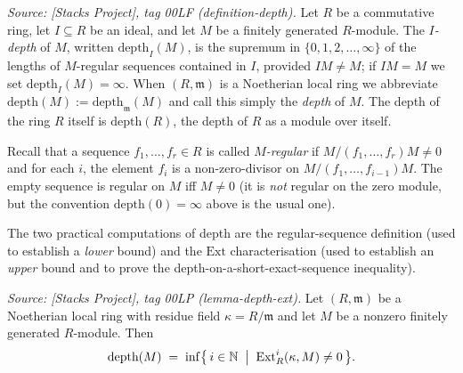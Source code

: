\begin{definition}\leanok
  \label{def:depth}
  \textit{Source: [Stacks Project], tag 00LF (definition-depth).}
  Let \(R\) be a commutative ring, let \(I \subseteq R\) be an ideal, and let \(M\) be a finitely
  generated \(R\)-module. The \emph{\(I\)-depth} of \(M\), written \(\text{depth}_I(M)\), is the
  supremum in \(\{0, 1, 2, \dots, \infty\}\) of the lengths of \(M\)-regular sequences contained
  in \(I\), provided \(IM \neq M\); if \(IM = M\) we set \(\text{depth}_I(M) = \infty\). When
  \((R, \mathfrak{m})\) is a Noetherian local ring we abbreviate
  \(\text{depth}(M) := \text{depth}_{\mathfrak{m}}(M)\) and call this simply the
  \emph{depth} of \(M\). The depth of the ring \(R\) itself is \(\text{depth}(R)\), the depth
  of \(R\) as a module over itself.
\end{definition}

Recall that a sequence \(f_1, \dots, f_r \in R\) is called \emph{\(M\)-regular} if
\(M/(f_1, \dots, f_r)M \neq 0\) and for each \(i\), the element \(f_i\) is a non-zero-divisor on
\(M/(f_1, \dots, f_{i-1})M\). The empty sequence is regular on \(M\) iff \(M \neq 0\) (it is
\emph{not} regular on the zero module, but the convention \(\text{depth}(0) = \infty\)
above is the usual one).

The two practical computations of depth are the regular-sequence definition (used to
establish a \emph{lower} bound) and the \(\text{Ext}\) characterisation (used to establish an
\emph{upper} bound and to prove the depth-on-a-short-exact-sequence inequality).

\begin{lemma}\leanok
  \label{lem:depth_via_ext}

  \textit{Source: [Stacks Project], tag 00LP (lemma-depth-ext).}
  Let \((R, \mathfrak{m})\) be a Noetherian local ring with residue field
  \(\kappa = R/\mathfrak{m}\) and let \(M\) be a nonzero finitely generated \(R\)-module. Then
  \[
    \text{depth}(M) \;=\; \inf\bigl\{\, i \in \mathbb{N} \;\bigm|\; \text{Ext}^i_R(\kappa, M) \neq 0 \,\bigr\}.
  \]
\end{lemma}

